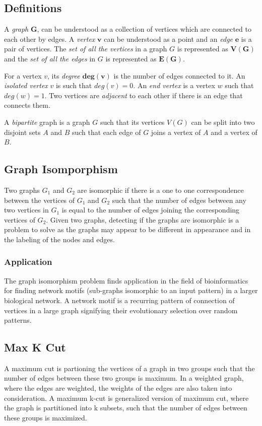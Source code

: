 \subsection{Definitions}
\label{graphtheory: definitions}
A \emph{graph} $\boldsymbol{G}$, can be understood as a collection of vertices which are
connected to each other by edges.  A \emph{vertex} $\boldsymbol{v}$ can be understood as a
point and an \emph{edge} $\boldsymbol{e}$ is a pair of vertices.  The \emph{set of all the vertices}
in a graph $G$ is represented as $\boldsymbol{V(G)}$ and the \emph{set of all the
edges} in $G$ is represented as $\boldsymbol{E(G)}$.

For a vertex $v$, its \emph{degree} $\boldsymbol{deg(v)}$ is the number of edges
connected to it.  An \emph{isolated vertex} $v$ is such that $deg(v) = 0$. An
\emph{end vertex} is a vertex $w$ such that $deg(w) = 1$.  Two vertices are
\emph{adjacent} to each other if there is an edge that connects them.

A \emph{bipartite} graph is a graph $G$ such that its vertices $V(G)$ can
be split into two disjoint sets $A$ and $B$ such that each edge of $G$ joins a
vertex of $A$ and a vertex of $B$. \cite{Newman10} 


\subsection{Graph Isomporphism}
Two graphs $G_1$ and $G_2$ are isomorphic if there is a one to one correspondence
between the vertices of $G_1$ and $G_2$ such that the number of edges between any
two vertices in $G_1$ is equal to the number of edges joining the corresponding
vertices of $G_2$.  Given two graphs, detecting if the graphs are isomorphic is
a problem to solve as the graphs may appear to be different in appearance and
in the labeling of the nodes and edges. \cite{Newman10}

\subsubsection{Application}
The graph isomorphism problem finds application in the field of bioinformatics
for finding network motifs (sub-graphs isomorphic to an input pattern) in a
larger biological network. A network motif is a recurring pattern of connection
of vertices in a large graph signifying their evolutionary selection over
random patterns. \cite{Bonnici2013}

\subsection{Max K Cut}
A maximum cut is partioning the vertices of a graph in two groups such that
the number of edges between these two groups is maximum. In a weighted graph,
where the edges are weighted, the weights of the edges are also taken into
consideration.  A maximum k-cut is generalized version of maximum cut, where
the graph is partitioned into k subsets, such that the number of edges between
these groups is maximized.

